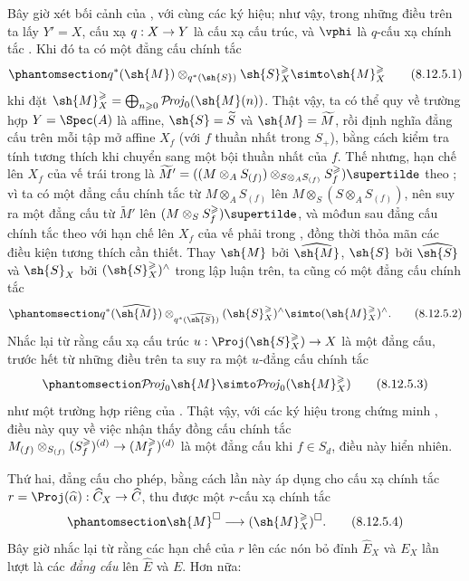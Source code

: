 \documentclass[oneside,10pt]{amsart}
\makeatletter
\renewcommand{\geq}{\geqslant}
\newcommand{\ega@arrow}[2]{\mathchoice{#1}{#2}{#2}{#2}}
\renewcommand{\to}{\ega@arrow{\longrightarrow}{\rightarrow}}
\def\shProj{\mathcal{P}\!\mathit{roj}}
\newcommand{\oldpage}[2][]{\marginnote{\normalfont\footnotesize\textbf{#1}~|~#2}\ignorespaces}
\let\EGAOriginalLabel\label
\renewcommand{\label}[1]{\phantomsection\EGAOriginalLabel{#1}}
\makeatother
\begin{document}
\begin{env}[8.12.5]
\label{II.8.12.5}
Bây giờ xét bối cảnh của , với cùng các ký hiệu;
như vậy, trong những điều trên ta lấy $Y'=X$, cấu xạ $q:X\to Y$ là cấu xạ cấu trúc, và $\vphi$ là $q$-cấu xạ chính tắc .
Khi đó ta có một đẳng cấu chính tắc
\[
\label{II.8.12.5.1}
  q^*(\sh{M})\otimes_{q^*(\sh{S})}\sh{S}_X^{\geq}
  \simto\sh{M}_X^{\geq}
\tag{8.12.5.1}
\]
khi đặt
$\sh{M}_X^{\geq}=\bigoplus_{n\geq0}\shProj_0(\sh{M}(n))$.
Thật vậy, ta có thể quy về trường hợp $Y=\Spec(A)$ là affine, $\sh{S}=\widetilde{S}$ và $\sh{M}=\widetilde{M}$, rồi định nghĩa đẳng cấu  trên mỗi tập mở affine $X_f$ (với $f$ thuần nhất trong $S_+$), bằng cách kiểm tra tính tương thích khi chuyển sang một bội thuần nhất của $f$.
Thế nhưng, hạn chế lên $X_f$ của vế trái trong  là
$\widetilde{M}'=((M\otimes_A S_{(f)})\otimes_{S\otimes_A S_{(f)}}S_f^{\geq})\supertilde$
theo ;
vì ta có một đẳng cấu chính tắc từ $M\otimes_A S_{(f)}$ lên $M\otimes_S(S\otimes_A S_{(f)})$, nên suy ra một đẳng cấu từ $\widetilde{M}'$ lên $(M\otimes_S S_f^{\geq})\supertilde$, và môđun sau đẳng cấu chính tắc theo  với hạn chế lên $X_f$ của vế phải trong , đồng thời thỏa mãn các điều kiện tương thích cần thiết.
\oldpage[II]{194}
Thay $\sh{M}$ bởi $\widehat{\sh{M}}$, $\sh{S}$ bởi $\widehat{\sh{S}}$ và $\sh{S}_X$ bởi $(\sh{S}_X^{\geq})^{\wedge}$ trong lập luận trên, ta cũng có một đẳng cấu chính tắc
\[
\label{II.8.12.5.2}
  q^*(\widehat{\sh{M}})
  \otimes_{q^*(\widehat{\sh{S}})}(\sh{S}_X^{\geq})^{\wedge}
  \simto(\sh{M}_X^{\geq})^{\wedge}.
\tag{8.12.5.2}
\]
Nhắc lại từ  rằng cấu xạ cấu trúc $u:\Proj(\sh{S}_X^{\geq})\to X$ là một đẳng cấu, trước hết từ những điều trên ta suy ra một $u$-đẳng cấu chính tắc
\[
\label{II.8.12.5.3}
  \shProj_0\sh{M}
  \simto\shProj_0(\sh{M}_X^{\geq})
\tag{8.12.5.3}
\]
như một trường hợp riêng của .
Thật vậy, với các ký hiệu trong chứng minh , điều này quy về việc nhận thấy đồng cấu chính tắc
$M_{(f)}\otimes_{S_{(f)}}(S_f^{\geq})^{(d)}\to(M_f^{\geq})^{(d)}$ là một đẳng cấu khi $f\in S_d$, điều này hiển nhiên.

Thứ hai, đẳng cấu  cho phép, bằng cách lần này áp dụng  cho cấu xạ chính tắc $r=\Proj(\widehat{\alpha}):\widehat{C}_X\to\widehat{C}$, thu được một $r$-cấu xạ chính tắc
\[
\label{II.8.12.5.4}
  \sh{M}^{\square}\to(\sh{M}_X^{\geq})^{\square}.
\tag{8.12.5.4}
\]
Bây giờ nhắc lại từ  rằng các hạn chế của $r$ lên các nón bỏ đỉnh $\widehat{E}_X$ và $E_X$ lần lượt là các \emph{đẳng cấu} lên $\widehat{E}$ và $E$.
Hơn nữa:
\end{env}
\end{document}
